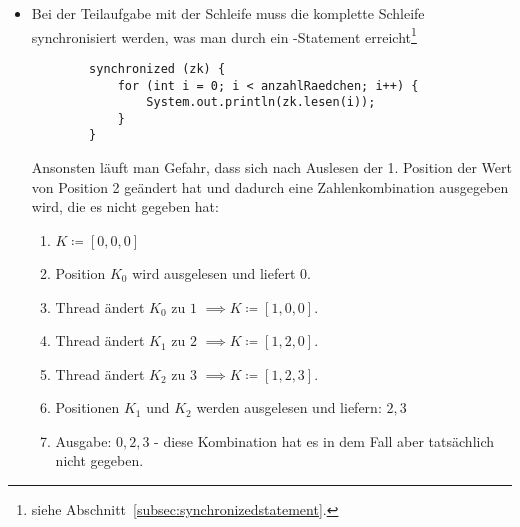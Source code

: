 \begin{itemize}
{    }.\\
    \item Bei der Teilaufgabe mit der Schleife muss die komplette Schleife synchronisiert werden, was man durch ein -Statement erreicht\footnote{siehe Abschnitt~\ref{subsec:synchronizedstatement}.}
    \begin{verbatim}
        synchronized (zk) {
            for (int i = 0; i < anzahlRaedchen; i++) {
                System.out.println(zk.lesen(i));
            }
        }
    \end{verbatim}
    Ansonsten läuft man Gefahr, dass sich nach Auslesen der 1. Position der Wert von Position 2 geändert hat und dadurch eine
    Zahlenkombination ausgegeben wird, die es nicht gegeben hat:
    \begin{enumerate}
        \item $K\coloneqq[0, 0, 0]$
        \item Position $K_0$ wird ausgelesen und liefert $0$.
        \item Thread ändert $K_0$ zu $1$ $\implies K\coloneqq[1, 0, 0] $.
        \item Thread ändert $K_1$ zu $2$ $\implies K\coloneqq[1, 2, 0] $.
        \item Thread ändert $K_2$ zu $3$ $\implies K\coloneqq[1, 2, 3] $.
        \item Positionen $K_1$ und $K_2$ werden ausgelesen und liefern: $2, 3$
        \item Ausgabe: $0, 2, 3$ - diese Kombination hat es in dem Fall aber tatsächlich nicht gegeben.
    \end{enumerate}
\end{itemize}


